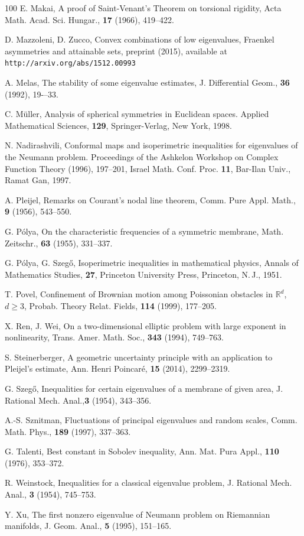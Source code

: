 \documentclass{amsart}
\theoremstyle{definition}
\numberwithin{equation}{section}
\begin{document}
\begin{thebibliography}{100}
 E. Makai, A proof of Saint-Venant's Theorem on torsional rigidity, Acta Math. Acad. Sci. Hungar., {\bf 17} (1966), 419--422.

 D. Mazzoleni, D. Zucco, Convex combinations of low eigenvalues, Fraenkel asymmetries and attainable sets, preprint (2015), available at {\tt http://arxiv.org/abs/1512.00993}

 A. Melas, The stability of some eigenvalue estimates, J. Differential Geom., {\bf 36} (1992), 19-–33.

 C. M\"uller, Analysis of spherical symmetries in Euclidean spaces. Applied Mathematical Sciences, {\bf 129}, Springer-Verlag, New York, 1998.

 N. Nadirashvili, Conformal maps and isoperimetric inequalities for eigenvalues of the Neumann problem. Proceedings of the Ashkelon Workshop on Complex Function Theory (1996), 197--201, Israel Math. Conf. Proc. {\bf 11}, Bar-Ilan Univ., Ramat Gan, 1997.

 A. Pleijel, Remarks on Courant's nodal line theorem, Comm. Pure Appl. Math., {\bf 9} (1956), 543--550. 

 G. P\'olya, On the characteristic frequencies of a symmetric membrane, Math. Zeitschr., {\bf 63} (1955), 331--337.

 G. P\'olya, G. Szeg\H{o}, Isoperimetric inequalities in mathematical physics, Annals of Mathematics Studies, {\bf 27}, Princeton University Press, Princeton, N.\,J., 1951.

 T. Povel, Confinement of Brownian motion among Poissonian obstacles in $\mathbb{R}^d$, $d\ge 3$, Probab. Theory Relat. Fields, {\bf 114} (1999), 177--205.

 X. Ren, J. Wei, On a two-dimensional elliptic problem with large exponent in nonlinearity, Trans. Amer. Math. Soc., {\bf 343} (1994), 749--763. 

 S. Steinerberger, A geometric uncertainty principle with an application to Pleijel's estimate, Ann. Henri Poincar\'e, {\bf 15} (2014), 2299--2319. 

 G. Szeg\H{o}, Inequalities for certain eigenvalues of a membrane of given area, J. Rational Mech. Anal.,{\bf 3} (1954), 343--356.

 A.-S. Sznitman, Fluctuations of principal eigenvalues and random scales, Comm. Math. Phys., {\bf 189} (1997), 337--363.

 G. Talenti, Best constant in Sobolev inequality, Ann. Mat. Pura Appl., {\bf 110} (1976), 353--372.

 R. Weinstock, Inequalities for a classical eigenvalue problem, J. Rational Mech. Anal., {\bf 3} (1954), 745--753.

 Y. Xu, The first nonzero eigenvalue of Neumann problem on Riemannian manifolds, J. Geom. Anal., {\bf 5} (1995), 151--165.

\end{thebibliography}
\end{document}

